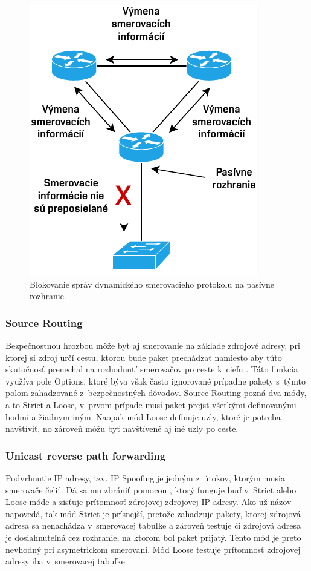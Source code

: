 \begin{figure}[H]
	\begin{center}
		\includegraphics[scale=1]{obrazky/passive-interface.pdf}
	\end{center}
	\caption[Pasívne rozhranie pri smerovacích protokoloch]{Blokovanie správ dynamického smerovacieho protokolu na pasívne rozhranie.}
	\label{fig:passive-int}
\end{figure} 

\subsubsection{Source Routing}
Bezpečnostnou hrozbou môže byť aj smerovanie na základe zdrojové adresy, pri ktorej si zdroj určí cestu, ktorou bude paket prechádzať namiesto aby túto skutočnosť prenechal na rozhodnutí smerovačov po ceste k~cieľu \cite{CIS_DrTLsgXv24lxeIIM}. Táto funkcia využíva pole Options, ktoré býva však často ignorované prípadne pakety s~týmto polom zahadzované z~bezpečnostných dôvodov. Source Routing pozná dva módy, a to Strict a Loose, v~prvom prípade musí paket prejsť všetkými definovanými bodmi a žiadnym iným. Naopak mód Loose definuje uzly, ktoré je potreba navštíviť, no zároveň môžu byť navštívené aj iné uzly po ceste.  

\subsubsection{Unicast reverse path forwarding}
Podvrhnutie IP adresy, tzv. IP Spoofing je jedným z~útokov, ktorým musia smerovače čeliť. Dá sa mu zbrániť pomocou  \cite{Jackson2010}, ktorý funguje buď v~Strict alebo Loose móde a zisťuje prítomnosť zdrojovej zdrojovej IP adresy. Ako už názov napovedá, tak mód Strict je prísnejší, pretože zahadzuje pakety, ktorej zdrojová adresa sa nenachádza v~smerovacej tabuľke a zároveň testuje či zdrojová adresa je dosiahnuteľná cez rozhranie, na ktorom bol paket prijatý. Tento mód je preto nevhodný pri asymetrickom smerovaní. Mód Loose testuje prítomnosť zdrojovej adresy iba v~smerovacej tabuľke. 

